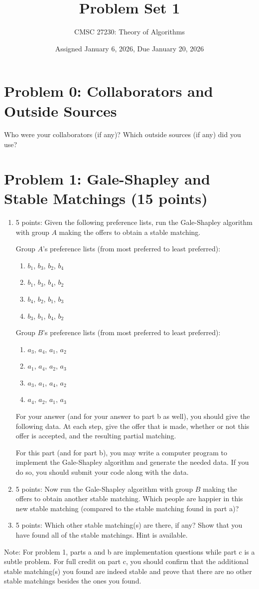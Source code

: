 \documentclass[12pt]{article}
\title{Problem Set 1}
\author{CMSC 27230: Theory of Algorithms}
\date{Assigned January 6, 2026, Due January 20, 2026}
\begin{document}
\maketitle

\thispagestyle{empty}
\section*{Problem 0: Collaborators and Outside Sources}
Who were your collaborators (if any)? Which outside sources (if any) did you use?
\section*{Problem 1: Gale-Shapley and Stable Matchings (15 points)}
\begin{enumerate}
\item[(a)] 5 points: Given the following preference lists, run the Gale-Shapley algorithm with group $A$ making the offers to obtain a stable matching.

Group $A$'s preference lists (from most preferred to least preferred):
\begin{enumerate}
\item[$a_1$:] $b_1$, $b_3$, $b_2$, $b_4$
\item[$a_2$:] $b_1$, $b_3$, $b_4$, $b_2$
\item[$a_3$:] $b_4$, $b_2$, $b_1$, $b_3$
\item[$a_4$:] $b_3$, $b_1$, $b_4$, $b_2$
\end{enumerate}
Group $B$'s preference lists (from most preferred to least preferred):
\begin{enumerate}
\item[$b_1$:] $a_3$, $a_4$, $a_1$, $a_2$
\item[$b_2$:] $a_1$, $a_4$, $a_2$, $a_3$
\item[$b_3$:] $a_3$, $a_1$, $a_4$, $a_2$
\item[$b_4$:] $a_4$, $a_2$, $a_1$, $a_3$
\end{enumerate}
For your answer (and for your answer to part b as well), you should give the following data. At each step, give the offer that is made, whether or not this offer is accepted, and the resulting partial matching.

For this part (and for part b), you may write a computer program to implement the Gale-Shapley algorithm and generate the needed data. If you do so, you should submit your code along with the data.
\item[(b)] 5 points: Now run the Gale-Shapley algorithm with group $B$ making the offers to obtain another stable matching. Which people are happier in this new stable matching (compared to the stable matching found in part a)?
\item[(c)] 5 points: Which other stable matching(s) are there, if any? Show that you have found all of the stable matchings. Hint is available.
\end{enumerate}
Note: For problem 1, parts a and b are implementation questions while part c is a subtle problem. For full credit on part c, you should confirm that the additional stable matching(s) you found are indeed stable and prove that there are no other stable matchings besides the ones you found.
\end{document}
